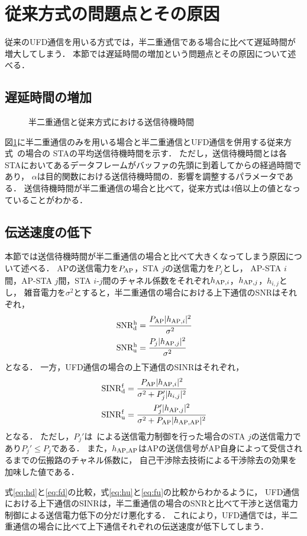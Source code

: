 \documentclass[technicalreport]{ieicej}
\begin{document}
\section{従来方式の問題点とその原因}\label{sec:problem}
	従来のUFD通信を用いる方式では，半二重通信である場合に比べて遅延時間が増大してしまう．
	本節では遅延時間の増加という問題点とその原因について述べる．
	\subsection{遅延時間の増加}
		\begin{figure}[t]
			\centering
			\caption{半二重通信と従来方式における送信待機時間}
			\label{fig:delay_sub}
		\end{figure}
		図\ref{fig:delay_sub}に半二重通信のみを用いる場合と半二重通信とUFD通信を併用する従来方式~\cite{promac_fair}の場合の
		STAの平均送信待機時間を示す．
		ただし，送信待機時間とは各STAにおいてあるデータフレームがバッファの先頭に到着してからの経過時間であり，
		$\alpha$は目的関数における送信待機時間の．影響を調整するパラメータである．
		送信待機時間が半二重通信の場合と比べて，従来方式は4倍以上の値となっていることがわかる．
	\subsection{伝送速度の低下}
		本節では送信待機時間が半二重通信の場合と比べて大きくなってしまう原因について述べる．
		APの送信電力を$P_{\rm AP}$，STA $j$の送信電力を$P_j$とし，
		AP-STA $i$間，AP-STA $j$間，STA $i$-$j$間のチャネル係数をそれぞれ$h_{{\rm AP},i}$，$h_{{\rm AP},j}$，$h_{i,j}$とし，
		雑音電力を$\sigma^2$とすると，半二重通信の場合における上下通信のSNRはそれぞれ，
		\begin{align}
			{\rm SNR_{\rm d}^{\rm h}} &= \cfrac{P_{\rm AP}|h_{{\rm AP},i}|^2}{\sigma^2} \label{eq:hd}\\
			{\rm SNR_{\rm u}^{\rm h}} &= \cfrac{P_j |h_{{\rm AP},j}|^2}{\sigma^2}\label{eq:hu}
		\end{align}
		となる．
		一方，UFD通信の場合の上下通信のSINRはそれぞれ，
		\begin{align}
			{\rm SINR_{\rm d}^{\rm f}} &= \cfrac{P_{\rm AP} |h_{{\rm AP},i}|^2}{\sigma^2+P_j'|h_{i,j}|^2}\label{eq:fd}\\
			{\rm SINR_{\rm u}^{\rm f}} &= \cfrac{P_j' |h_{{\rm AP},j}|^2}{\sigma^2+P_{\rm AP}|h_{\rm AP,AP}|^2}\label{eq:fu}
		\end{align}
		となる．
		ただし，$P_j'$は~\cite{promac}による送信電力制御を行った場合のSTA $j$の送信電力であり$P_j'\leq P_j$である．
		また，$h_{\rm AP,AP}$はAPの送信信号がAP自身によって受信されるまでの伝搬路のチャネル係数に，
		自己干渉除去技術による干渉除去の効果を加味した値である．
		\par
		式\eqref{eq:hd}と\eqref{eq:fd}の比較，式\eqref{eq:hu}と\eqref{eq:fu}の比較からわかるように，
		UFD通信における上下通信のSINRは，半二重通信の場合のSNRと比べて干渉と送信電力制御による送信電力低下の分だけ悪化する．
		これにより，UFD通信では，半二重通信の場合に比べて上下通信それぞれの伝送速度が低下してしまう．
\end{document}
